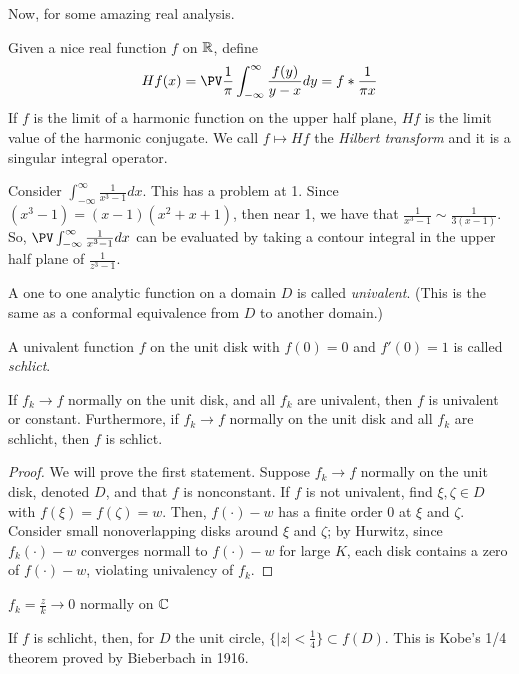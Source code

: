 \documentclass[11pt,leqno,oneside]{amsart}
\begin{document}
  Now, for some amazing real analysis.
  \begin{defn}
    Given a nice real function $f$ on ${\mathbb R}$, define \[
      H f(x) = \PV \frac{1}{\pi} \int_{-\infty}^\infty
      \frac{f(y)}{y-x}dy = f * \frac{1}{\pi x}
    \]
    If $f$ is the limit of a harmonic function on the upper half
    plane, $Hf$ is the limit value of the harmonic conjugate. We call
    $f \mapsto Hf$ the \emph{Hilbert transform} and it is a singular
    integral operator.
  \end{defn}
  \begin{example}
    Consider $\int_{-\infty}^\infty \frac{1}{x^3-1}dx$. This has a
    problem at 1. Since $(x^3-1) = (x-1)(x^2+x+1)$, then near 1, we
    have that $\frac{1}{x^3-1} \sim \frac{1}{3(x-1)}$. So, $\PV
    \int_{-\infty}^\infty \frac{1}{x^3-1}dx$ can be evaluated by
    taking a contour integral in the upper half plane of
    $\frac{1}{z^3-1}$. 
  \end{example}
  \begin{defn}
    A one to one analytic function on a domain $D$ is called
    \emph{univalent}. (This is the same as a conformal equivalence
    from $D$ to another domain.)
  \end{defn}
  \begin{defn}
    A univalent function $f$ on the unit disk with $f(0) = 0$ and
    $f'(0) = 1$ is called \emph{schlict}.
  \end{defn}
  \begin{prop}
    If $f_k \to f$ normally on the unit disk, and all $f_k$ are
    univalent, then $f$ is univalent or constant. Furthermore, if $f_k
    \to f$ normally on the unit disk and all $f_k$ are schlicht, then
    $f$ is schlict. 
  \end{prop}
  \begin{proof}
    We will prove the first statement. Suppose $f_k \to f$ normally on
    the unit disk, denoted $D$, and that $f$ is nonconstant. If $f$ is
    not univalent, find $\xi, \zeta \in D$ with $f(\xi) = f(\zeta) =
    w$. Then, $f(\cdot)-w$ has a finite order 0 at $\xi$ and
    $\zeta$. Consider small nonoverlapping disks around $\xi$ and
    $\zeta$; by Hurwitz, since $f_k(\cdot)-w$ converges normall to
    $f(\cdot)-w$ for large $K$, each disk contains a zero of
    $f(\cdot)-w$, violating univalency of $f_k$. 
  \end{proof}
  \begin{example}
    $f_k = \frac{z}{k} \to 0$ normally on ${\mathbb C}$
  \end{example}
  \begin{prop}
    If $f$ is schlicht, then, for $D$ the unit circle, $\{|z| <
    \frac{1}{4}\} \subset f(D)$. This is Kobe's 1/4 theorem proved by
    Bieberbach in 1916. 
  \end{prop}
\end{document}
